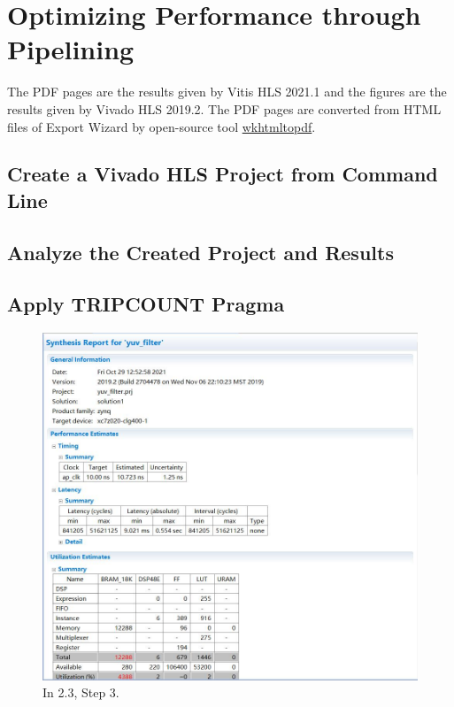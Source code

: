 \documentclass[a4paper]{article}
\begin{document}
\section{Optimizing Performance through Pipelining}
The PDF pages are the results given by Vitis HLS 2021.1 and the figures are the results given by Vivado HLS 2019.2. The PDF pages are converted from HTML files of Export Wizard by open-source tool \href{https://wkhtmltopdf.org/}{wkhtmltopdf}.
\subsection{Create a Vivado HLS Project from Command Line}
\subsection{Analyze the Created Project and Results}
\subsection{Apply TRIPCOUNT Pragma}


\begin{figure}[H]
    \centering
    \includegraphics[width=1\textwidth]{1.jpg}
    \caption{In 2.3, Step 3.}
\end{figure}
\end{document}
